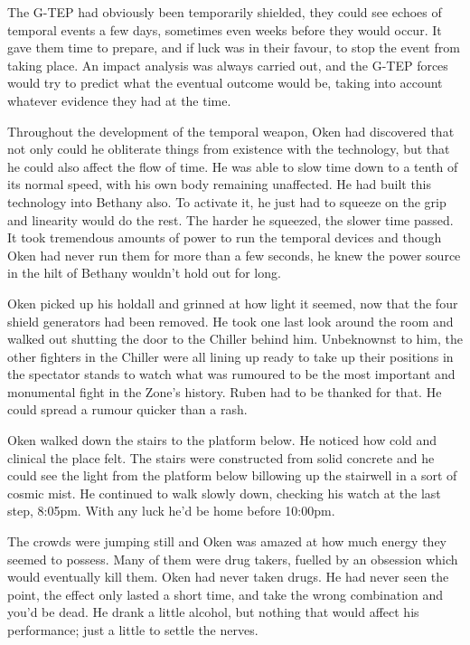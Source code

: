 The G-TEP had obviously been temporarily shielded, they could see echoes of temporal events a few days, sometimes even weeks before they would occur. It gave them time to prepare, and if luck was in their favour, to stop the event from taking place. An impact analysis was always carried out, and the G-TEP forces would try to predict what the eventual outcome would be, taking into account whatever evidence they had at the time.

Throughout the development of the temporal weapon, Oken had discovered that not only could he obliterate things from existence with the technology, but that he could also affect the flow of time. He was able to slow time down to a tenth of its normal speed, with his own body remaining unaffected. He had built this technology into Bethany also. To activate it, he just had to squeeze on the grip and linearity would do the rest. The harder he squeezed, the slower time passed. It took tremendous amounts of power to run the temporal devices and though Oken had never run them for more than a few seconds, he knew the power source in the hilt of Bethany wouldn't hold out for long.

Oken picked up his holdall and grinned at how light it seemed, now that the four shield generators had been removed. He took one last look around the room and walked out shutting the door to the Chiller behind him. Unbeknownst to him, the other fighters in the Chiller were all lining up ready to take up their positions in the spectator stands to watch what was rumoured to be the most important and monumental fight in the Zone's history. Ruben had to be thanked for that. He could spread a rumour quicker than a rash.

Oken walked down the stairs to the platform below. He noticed how cold and clinical the place felt. The stairs were constructed from solid concrete and he could see the light from the platform below billowing up the stairwell in a sort of cosmic mist. He continued to walk slowly down, checking his watch at the last step, 8:05pm. With any luck he'd be home before 10:00pm.

The crowds were jumping still and Oken was amazed at how much energy they seemed to possess. Many of them were drug takers, fuelled by an obsession which would eventually kill them. Oken had never taken drugs. He had never seen the point, the effect only lasted a short time, and take the wrong combination and you'd be dead. He drank a little alcohol, but nothing that would affect his performance; just a little to settle the nerves.

